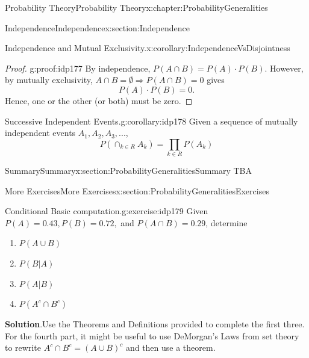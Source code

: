 \documentclass[oneside,10pt,]{book}
\newcommand{\blocktitlefont}{\relax}
\numberwithin{equation}{section}
\begin{document}
\begin{chapterptx}{Probability Theory}{}{Probability Theory}{}{}{x:chapter:ProbabilityGeneralities}
\begin{sectionptx}{Independence}{}{Independence}{}{}{x:section:Independence}
\begin{corollary}{Independence and Mutual Exclusivity.}{}{x:corollary:IndependenceVsDisjointness}
\end{corollary}
\begin{proof}{}{g:proof:idp177}
By independence, \(P(A \cap B) = P(A) \cdot P(B)\). However, by mutually exclusivity, \(A \cap B = \emptyset \Rightarrow P(A \cap B) = 0\) gives%
\begin{equation*}
P(A) \cdot P(B) = 0.
\end{equation*}
Hence, one or the other (or both) must be zero.%
\end{proof}
\begin{corollary}{Successive Independent Events.}{}{g:corollary:idp178}%
Given a sequence of mutually independent events \(A_1, A_2, A_3, ...\),%
\begin{equation*}
P(\cap_{k \in R} A_k) = \prod_{k \in R} P(A_k)
\end{equation*}
%
\end{corollary}
\end{sectionptx}
%
%
\typeout{************************************************}
\typeout{************************************************}
%
\begin{sectionptx}{Summary}{}{Summary}{}{}{x:section:ProbabilityGeneralitiesSummary}
TBA%
\end{sectionptx}
%
%
\typeout{************************************************}
\typeout{************************************************}
%
\begin{sectionptx}{More Exercises}{}{More Exercises}{}{}{x:section:ProbabilityGeneralitiesExercises}
\begin{inlineexercise}{Conditional Basic computation.}{g:exercise:idp179}%
Given \(P(A) = 0.43, P(B) = 0.72,\) and \(P(A \cap B) = 0.29\), determine%
\begin{enumerate}
\item{}\(\displaystyle P(A \cup B)\)%
\item{}\(\displaystyle P(B | A)\)%
\item{}\(\displaystyle P(A | B)\)%
\item{}\(\displaystyle P(A^c \cap B^c)\)%
\end{enumerate}
%
\par\smallskip%
\noindent\textbf{\blocktitlefont Solution}.\hypertarget{g:solution:idp180}{}\quad{}Use the Theorems and Definitions provided to complete the first three.  For the fourth part, it might be useful to use DeMorgan's Laws from set theory to rewrite \(A^c \cap B^c = (A \cup B)^c\) and then use a theorem.%
\end{inlineexercise}%

\end{sectionptx}
\end{chapterptx}
\end{document}

